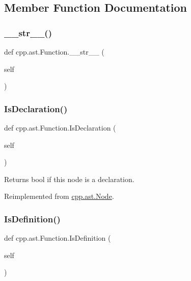 \subsection{Member Function Documentation}
\mbox{\label{classcpp_1_1ast_1_1Function_aaef91d6a3b1eb2703eebb32d39c45978}} 
\subsubsection{\texorpdfstring{\_\_str\_\_()}{\_\_str\_\_()}}
{\footnotesize\ttfamily def cpp.\+ast.\+Function.\+\_\+\+\_\+str\+\_\+\+\_\+ (\begin{DoxyParamCaption}\item[{}]{self }\end{DoxyParamCaption})}

\mbox{\label{classcpp_1_1ast_1_1Function_ab9120d9a774eb5860d220b3bcdcaa87e}} 
\subsubsection{\texorpdfstring{IsDeclaration()}{IsDeclaration()}}
{\footnotesize\ttfamily def cpp.\+ast.\+Function.\+Is\+Declaration (\begin{DoxyParamCaption}\item[{}]{self }\end{DoxyParamCaption})}

\begin{DoxyVerb}Returns bool if this node is a declaration.\end{DoxyVerb}
 

Reimplemented from \mbox{\hyperlink{classcpp_1_1ast_1_1Node_ab3eca703a79fb65bc25dfbcb7547c79e}{cpp.\+ast.\+Node}}.

\mbox{\label{classcpp_1_1ast_1_1Function_ad5d96144bd8418ac72332bffb21ea86f}} 
\subsubsection{\texorpdfstring{IsDefinition()}{IsDefinition()}}
{\footnotesize\ttfamily def cpp.\+ast.\+Function.\+Is\+Definition (\begin{DoxyParamCaption}\item[{}]{self }\end{DoxyParamCaption})}

